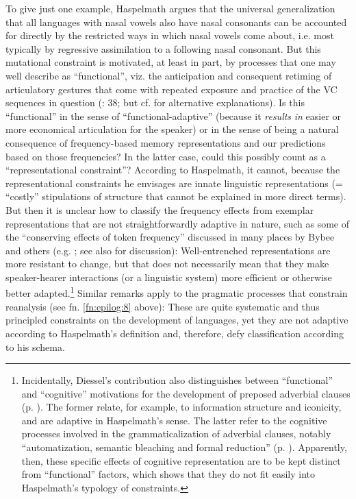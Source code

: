 \documentclass[output=paper]{langsci/langscibook}
\begin{document}
To give just one example, Haspelmath argues that the universal generalization that all languages with nasal vowels also have nasal consonants can be accounted for directly by the restricted ways in which nasal vowels come about, i.e. most typically by regressive assimilation to a following nasal consonant. But this mutational constraint is motivated, at least in part, by processes that one may well describe as “functional”, viz. the anticipation and consequent retiming of articulatory gestures that come with repeated exposure and practice of the VC sequences in question (\citealt{Bybee2015}: 38; but cf. \citealt{Ohala1989,Ohala2003} for alternative explanations). Is this “functional” in the sense of “functional-adaptive” (because it \textit{results} \textit{in} easier or more economical articulation for the speaker) or in the sense of being a natural consequence of frequency-based memory representations and our predictions based on those frequencies? In the latter case, could this possibly count as a “representational constraint”? According to Haspelmath, it cannot, because the representational constraints he envisages are innate linguistic representations (= “costly” stipulations of structure that cannot be explained in more direct terms). But then it is unclear how to classify the frequency effects from exemplar representations that are not straightforwardly adaptive in nature, such as some of the “conserving effects of token frequency” discussed in many places by Bybee and others (e.g. \citealt{BybeeThompson1997,Pierrehumbert2001,Bybee2001}; see also \citealt{Cristofaro2015} for discussion): Well-entrenched representations are more resistant to change, but that does not necessarily mean that they make speaker-hearer interactions (or a linguistic system) more efficient or otherwise better adapted.\footnote{Incidentally, Diessel’s contribution also distinguishes between “functional” and “cognitive” motivations for the development of preposed adverbial clauses (p. \pageref{p:diessel:preposedadverbialclauses}). The former relate, for example, to information structure and iconicity, and are adaptive in Haspelmath’s sense. The latter refer to the cognitive processes involved in the grammaticalization of adverbial clauses, notably “automatization, semantic bleaching and formal reduction” (p. \pageref{p:xxx:automatization}). Apparently, then, these specific effects of cognitive representation are to be kept distinct from “functional” factors, which shows that they do not fit easily into Haspelmath’s typology of constraints.}  Similar remarks apply to the pragmatic processes that constrain reanalysis (see fn. \ref{fn:epilog:8} above): These are quite systematic and thus principled constraints on the development of languages, yet they are not adaptive according to Haspelmath’s definition and, therefore, defy classification according to his schema.
\end{document}
